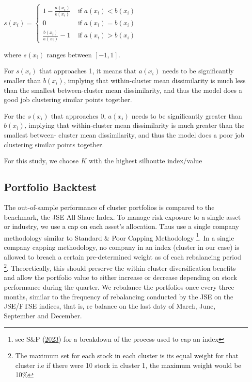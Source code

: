 \documentclass[11pt,preprint, authoryear]{elsarticle}
\numberwithin{equation}{section}
\numberwithin{figure}{section}
\numberwithin{table}{section}
\let\rmarkdownfootnote\footnote%
\def\footnote{\protect\rmarkdownfootnote}
\begin{document}
\(s\left(x_i\right)= \begin{cases}1-\frac{a\left(x_i\right)}{b\left(x_i\right)} & \text { if } a\left(x_i\right)<b\left(x_i\right) \\ 0 & \text { if } a\left(x_i\right)=b\left(x_i\right) \\ \frac{b\left(x_i\right)}{a\left(x_i\right)}-1 & \text { if } a\left(x_i\right)>b\left(x_i\right)\end{cases}\)

where \(s(x_i)\) ranges between \([-1, 1]\).

For \(s(x_i)\) that approaches 1, it means that \(a(x_i)\) needs to be
significantly smaller than \(b(x_i)\), implying that within-cluster mean
dissimilarity is much less than the smallest between-cluster mean
dissimilarity, and thus the model does a good job clustering similar
points together.

For the \(s(x_i)\) that approaches 0, \(a(x_i)\) needs to be
significantly greater than \(b(x_i)\), implying that within-cluster mean
dissimilarity is much greater than the smallest between- cluster mean
dissimilarity, and thus the model does a poor job clustering similar
points together.

For this study, we choose \(K\) with the highest silhoutte index/value

\hypertarget{portfolio-backtest}{%
\subsection{Portfolio Backtest}\label{portfolio-backtest}}

The out-of-sample performance of cluster portfolios is compared to the
benchmark, the JSE All Share Index. To manage risk exposure to a single
asset or industry, we use a cap on each asset's allocation. Thus use a
single company methodology similar to Standard \& Poor Capping
Methodology \footnote{see S\&P (\protect\hyperlink{ref-sp}{2023}) for a
  breakdown of the process used to cap an index}. In a single company
capping methodology, no company in an index (cluster in our case) is
allowed to breach a certain pre-determined weight as of each rebalancing
period \footnote{The maximum set for each stock in each cluster is its
  equal weight for that cluster i.e if there were 10 stock in cluster 1,
  the maximum weight would be 10\%}. Theoretically, this should preserve
the within cluster diversification benefits and allow the portfolio
value to either increase or decrease depending on stock performance
during the quarter. We rebalance the portfolios once every three months,
similar to the frequency of rebalancing conducted by the JSE on the
JSE/FTSE indices, that is, re balance on the last daty of March, June,
September and December.
\end{document}
